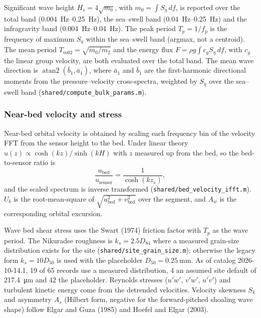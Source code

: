 Significant wave height $H_s = 4\sqrt{m_0}$, with $m_0 = \int S_\eta\,df$, is
reported over the total band (\SIrange{0.004}{0.25}{\hertz}), the sea--swell band
(\SIrange{0.04}{0.25}{\hertz}) and the infragravity band
(\SIrange{0.004}{0.04}{\hertz}). The peak period $T_p = 1/f_p$ is the frequency of
maximum $S_\eta$ within the sea--swell band (argmax, not a centroid). The mean
period $T_{m02} = \sqrt{m_0/m_2}$ and the energy flux
$F = \rho g \int c_g S_\eta\,df$, with $c_g$ the linear group velocity, are both
evaluated over the total band. The mean wave direction is
$\operatorname{atan2}(\bar b_1, \bar a_1)$, where $\bar a_1$ and $\bar b_1$ are the
first-harmonic directional moments from the pressure--velocity cross-spectra,
weighted by $S_\eta$ over the sea--swell band (\texttt{shared/compute\_bulk\_params.m}).

\subsubsection{Near-bed velocity and stress}

Near-bed orbital velocity is obtained by scaling each frequency bin of the
velocity FFT from the sensor height to the bed. Under linear theory
$u(z) \propto \cosh(kz)/\sinh(kH)$ with $z$ measured up from the bed, so the
bed-to-sensor ratio is
\begin{equation}
  \frac{u_\text{bed}}{u_\text{sensor}} = \frac{1}{\cosh(k z_s)} ,
  \label{eq:bedvel}
\end{equation}
and the scaled spectrum is inverse transformed (\texttt{shared/bed\_velocity\_ifft.m}).
$U_b$ is the root-mean-square of $\sqrt{u_\text{bed}^2 + v_\text{bed}^2}$ over the
segment, and $A_w$ is the corresponding orbital excursion.


Wave bed shear stress uses the Swart (1974) friction factor with $T_p$ as the
wave period. The Nikuradse roughness is $k_s = 2.5 D_{84}$ where a measured
grain-size distribution exists for the site (\texttt{shared/site\_grain\_size.m});
otherwise the legacy form $k_s = 10 D_{50}$ is used with the placeholder
$D_{50} = \SI{0.25}{\milli\meter}$. As of catalog 2026-10-14.1, 19 of 65 records
use a measured distribution, 4 an assumed site default of \SI{217.4}{\micro\meter}
and 42 the placeholder. Reynolds stresses ($\overline{u'w'}$, $\overline{v'w'}$,
$\overline{u'v'}$) and turbulent kinetic energy come from the detrended
velocities. Velocity skewness $S_k$ and asymmetry $A_s$ (Hilbert form, negative
for the forward-pitched shoaling wave shape) follow Elgar and Guza (1985) and
Hoefel and Elgar (2003).

